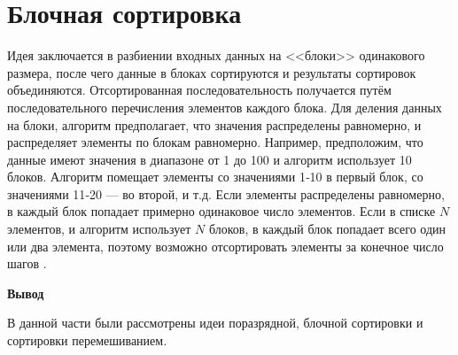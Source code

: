 \section{Блочная сортировка}
Идея заключается в  разбиении входных данных на <<блоки>> одинакового размера, после чего данные в блоках сортируются и результаты сортировок объединяются.
Отсортированная последовательность получается путём последовательного перечисления элементов каждого блока.
Для деления данных на блоки, алгоритм предполагает, что значения  распределены равномерно, и распределяет элементы по блокам равномерно. Например, предположим, что данные имеют значения в диапазоне от 1 до 100 и алгоритм использует 10 блоков. Алгоритм помещает элементы со значениями 1‑10 в первый блок, со значениями 11‑20 — во второй, и т.д.
Если элементы распределены равномерно, в каждый блок попадает примерно одинаковое число элементов. Если в списке $N$ элементов, и алгоритм использует $N$ блоков, в каждый блок попадает всего один или два элемента, поэтому возможно отсортировать элементы за конечное число шагов \cite{article_sorts}.






\textbf{Вывод}


В данной части были рассмотрены идеи поразрядной, блочной сортировки и сортировки перемешиванием.
